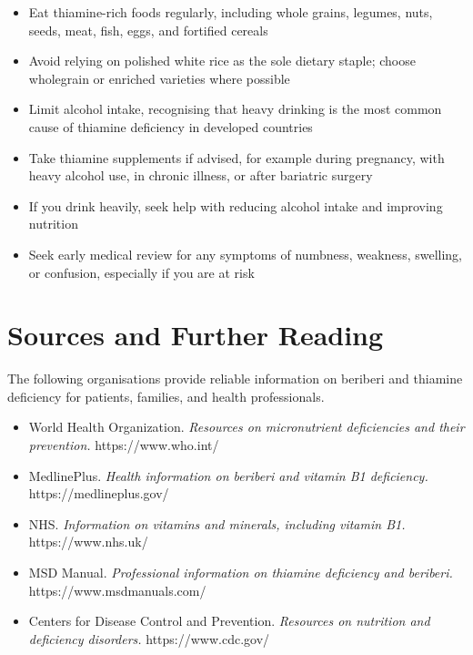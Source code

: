 \begin{itemize}
    \item Eat thiamine-rich foods regularly, including whole grains, legumes, nuts, seeds, meat, fish, eggs, and fortified cereals
    \item Avoid relying on polished white rice as the sole dietary staple; choose wholegrain or enriched varieties where possible
    \item Limit alcohol intake, recognising that heavy drinking is the most common cause of thiamine deficiency in developed countries
    \item Take thiamine supplements if advised, for example during pregnancy, with heavy alcohol use, in chronic illness, or after bariatric surgery
    \item If you drink heavily, seek help with reducing alcohol intake and improving nutrition
    \item Seek early medical review for any symptoms of numbness, weakness, swelling, or confusion, especially if you are at risk
\end{itemize}

\section*{Sources and Further Reading}
The following organisations provide reliable information on beriberi and thiamine deficiency for patients, families, and health professionals.

\begin{itemize}
    \item World Health Organization. \textit{Resources on micronutrient deficiencies and their prevention.} https://www.who.int/
    \item MedlinePlus. \textit{Health information on beriberi and vitamin B1 deficiency.} https://medlineplus.gov/
    \item NHS. \textit{Information on vitamins and minerals, including vitamin B1.} https://www.nhs.uk/
    \item MSD Manual. \textit{Professional information on thiamine deficiency and beriberi.} https://www.msdmanuals.com/
    \item Centers for Disease Control and Prevention. \textit{Resources on nutrition and deficiency disorders.} https://www.cdc.gov/
\end{itemize}
